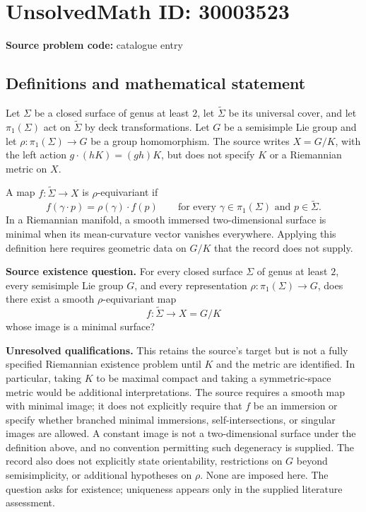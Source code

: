 \documentclass[11pt]{article}
\begin{document}
\section*{UnsolvedMath ID: 30003523}
\textbf{Source problem code:} catalogue entry
\subsection{Definitions and mathematical statement}
Let \(\Sigma\) be a closed surface of genus at least \(2\), let \(\widetilde\Sigma\) be its universal cover, and let \(\pi_1(\Sigma)\) act on \(\widetilde\Sigma\) by deck transformations. Let \(G\) be a semisimple Lie group and let \(\rho:\pi_1(\Sigma)\to G\) be a group homomorphism. The source writes \(X=G/K\), with the left action \(g\cdot(hK)=(gh)K\), but does not specify \(K\) or a Riemannian metric on \(X\).

A map \(f:\widetilde\Sigma\to X\) is \(\rho\)-equivariant if
\[
 f(\gamma\cdot p)=\rho(\gamma)\cdot f(p)
 \qquad\text{for every }\gamma\in\pi_1(\Sigma)\text{ and }p\in\widetilde\Sigma.
\]
In a Riemannian manifold, a smooth immersed two-dimensional surface is minimal when its mean-curvature vector vanishes everywhere. Applying this definition here requires geometric data on \(G/K\) that the record does not supply.

\textbf{Source existence question.} For every closed surface \(\Sigma\) of genus at least \(2\), every semisimple Lie group \(G\), and every representation \(\rho:\pi_1(\Sigma)\to G\), does there exist a smooth \(\rho\)-equivariant map
\[
 f:\widetilde\Sigma\longrightarrow X=G/K
\]
whose image is a minimal surface?

\textbf{Unresolved qualifications.} This retains the source's target but is not a fully specified Riemannian existence problem until \(K\) and the metric are identified. In particular, taking \(K\) to be maximal compact and taking a symmetric-space metric would be additional interpretations. The source requires a smooth map with minimal image; it does not explicitly require that \(f\) be an immersion or specify whether branched minimal immersions, self-intersections, or singular images are allowed. A constant image is not a two-dimensional surface under the definition above, and no convention permitting such degeneracy is supplied. The record also does not explicitly state orientability, restrictions on \(G\) beyond semisimplicity, or additional hypotheses on \(\rho\). None are imposed here. The question asks for existence; uniqueness appears only in the supplied literature assessment.
\end{document}
